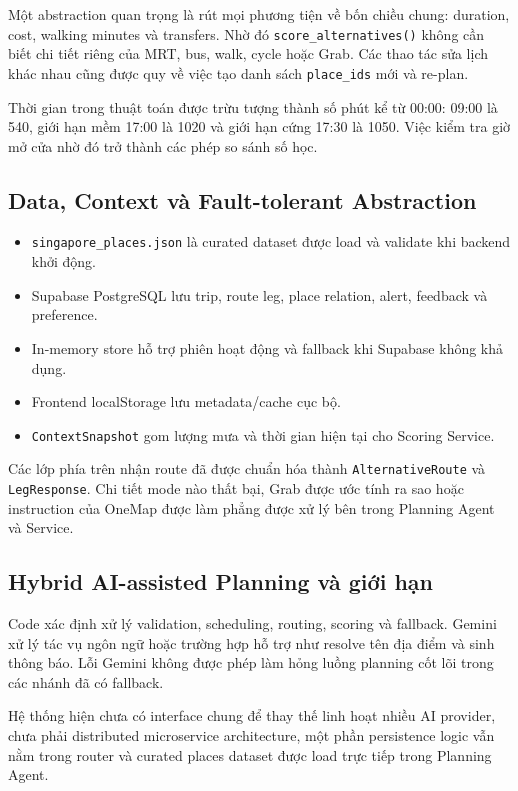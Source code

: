 \documentclass[12pt,a4paper]{article}
\begin{document}
Một abstraction quan trọng là rút mọi phương tiện về bốn chiều chung: duration, cost, walking minutes và transfers. Nhờ đó \texttt{score\_alternatives()} không cần biết chi tiết riêng của MRT, bus, walk, cycle hoặc Grab. Các thao tác sửa lịch khác nhau cũng được quy về việc tạo danh sách \texttt{place\_ids} mới và re-plan.

Thời gian trong thuật toán được trừu tượng thành số phút kể từ 00:00: 09:00 là 540, giới hạn mềm 17:00 là 1020 và giới hạn cứng 17:30 là 1050. Việc kiểm tra giờ mở cửa nhờ đó trở thành các phép so sánh số học.

\subsection{Data, Context và Fault-tolerant Abstraction}


\begin{itemize}
    \item \texttt{singapore\_places.json} là curated dataset được load và validate khi backend khởi động.
    \item Supabase PostgreSQL lưu trip, route leg, place relation, alert, feedback và preference.
    \item In-memory store hỗ trợ phiên hoạt động và fallback khi Supabase không khả dụng.
    \item Frontend localStorage lưu metadata/cache cục bộ.
    \item \texttt{ContextSnapshot} gom lượng mưa và thời gian hiện tại cho Scoring Service.
\end{itemize}

Các lớp phía trên nhận route đã được chuẩn hóa thành \texttt{AlternativeRoute} và \texttt{LegResponse}. Chi tiết mode nào thất bại, Grab được ước tính ra sao hoặc instruction của OneMap được làm phẳng được xử lý bên trong Planning Agent và Service.

\subsection{Hybrid AI-assisted Planning và giới hạn}


Code xác định xử lý validation, scheduling, routing, scoring và fallback. Gemini xử lý tác vụ ngôn ngữ hoặc trường hợp hỗ trợ như resolve tên địa điểm và sinh thông báo. Lỗi Gemini không được phép làm hỏng luồng planning cốt lõi trong các nhánh đã có fallback.

Hệ thống hiện chưa có interface chung để thay thế linh hoạt nhiều AI provider, chưa phải distributed microservice architecture, một phần persistence logic vẫn nằm trong router và curated places dataset được load trực tiếp trong Planning Agent.
\end{document}
